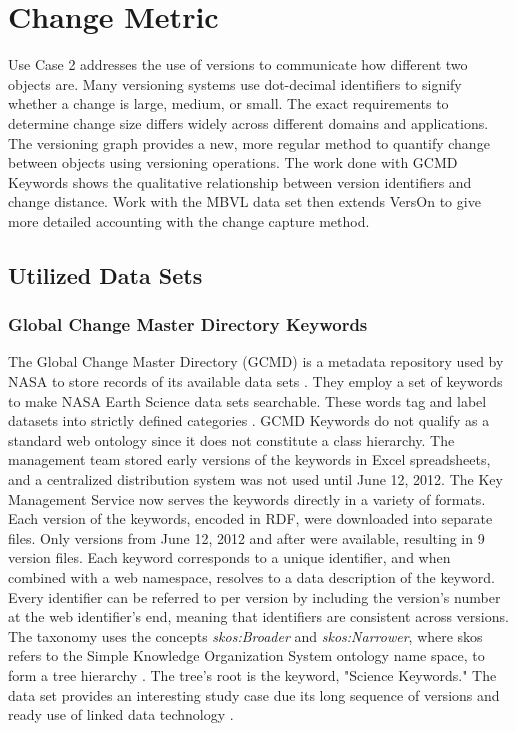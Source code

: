\section{Change Metric} \label{ch:distance}

Use Case 2 addresses the use of versions to communicate how different two objects are.
Many versioning systems use dot-decimal identifiers to signify whether a change is large, medium, or small.
The exact requirements to determine change size differs widely across different domains and applications.
The versioning graph provides a new, more regular method to quantify change between objects using versioning operations.
The work done with GCMD Keywords shows the qualitative relationship between version identifiers and change distance.
Work with the MBVL data set then extends VersOn to give more detailed accounting with the change capture method.

\subsection{Utilized Data Sets}

\subsubsection{Global Change Master Directory Keywords}

The Global Change Master Directory (GCMD) is a metadata repository used by NASA to store records of its available data sets \cite{Miled:2001:GCM:372202.372324}.
They employ a set of keywords to make NASA Earth Science data sets searchable.
These words tag and label datasets into strictly defined categories \cite{GCMDKey}.
GCMD Keywords do not qualify as a standard web ontology since it does not constitute a class hierarchy.
The management team stored early versions of the keywords in Excel spreadsheets, and a centralized distribution system was not used until June 12, 2012.
The Key Management Service now serves the keywords directly in a variety of formats.
Each version of the keywords, encoded in RDF, were downloaded into separate files.
Only versions from June 12, 2012 and after were available, resulting in 9 version files.
Each keyword corresponds to a unique identifier, and when combined with a web namespace, resolves to a data description of the keyword.
Every identifier can be referred to per version by including the version's number at the web identifier's end, meaning that identifiers are consistent across versions.
The taxonomy uses the concepts \textit{skos:Broader} and \textit{skos:Narrower}, where skos refers to the Simple Knowledge Organization System ontology name space, to form a tree hierarchy \cite{skos}.
The tree's root is the keyword, "Science Keywords."
The data set provides an interesting study case due its long sequence of versions and ready use of linked data technology \cite{Stevens2016}.

